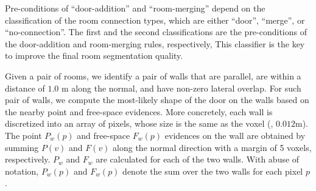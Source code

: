 






 Pre-conditions of
``door-addition'' and ``room-merging'' depend on the classification of
the room connection types, which are either ``door'', ``merge'', or
``no-connection''. The first and the second classifications are the
pre-conditions of the door-addition and room-merging rules, respectively,
This classifier is the key to improve the final room segmentation quality.

Given a pair of rooms, we identify a pair of walls that are parallel,
are within a distance of $1.0$ m along the normal, and have non-zero
lateral overlap. For such pair of walls, we compute the most-likely
shape of the door on the walls based on the nearby point and free-space
evidences. More concretely, each wall is discretized into an array of
pixels, whose size is the same as the voxel (\ie, $0.012$m). The point
$P_w(p)$ and free-space $F_w(p)$ evidences on the wall are obtained by
summing $P(v)$ and $F(v)$ along the normal direction with a margin of 5
voxels, respectively.
$P_w$ and $F_w$ are calculated for each of the two walls.
With abuse of notation, $P_w(p)$ and $F_w(p)$ denote the sum over the
two walls for each pixel $p$.

